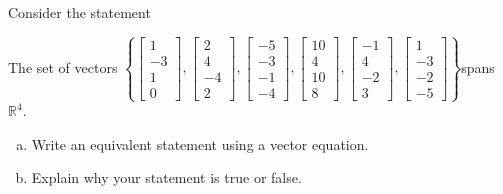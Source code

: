 
\begin{exerciseStatement}


Consider the statement 
\begin{center}\begin{minipage}{0.8\textwidth}
 The set of vectors \( \left\{ \left[\begin{array}{c}
1 \\
-3 \\
1 \\
0
\end{array}\right] , \left[\begin{array}{c}
2 \\
4 \\
-4 \\
2
\end{array}\right] , \left[\begin{array}{c}
-5 \\
-3 \\
-1 \\
-4
\end{array}\right] , \left[\begin{array}{c}
10 \\
4 \\
10 \\
8
\end{array}\right] , \left[\begin{array}{c}
-1 \\
4 \\
-2 \\
3
\end{array}\right] , \left[\begin{array}{c}
1 \\
-3 \\
-2 \\
-5
\end{array}\right] \right\} \)spans \(\mathbb{R}^4\). 
\end{minipage}\end{center}
    


\begin{enumerate}[(a)]
\item  Write an equivalent statement using a vector equation.
\item  Explain why your statement is true or false.
\end{enumerate}
    
\end{exerciseStatement}
    
